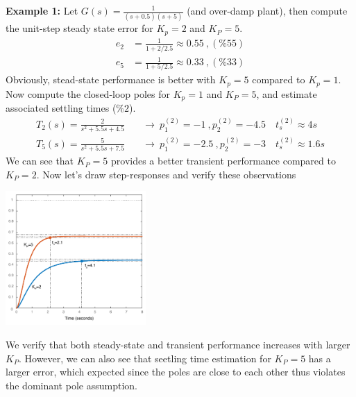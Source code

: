 \documentclass[twoside]{article}
\begin{document}
\textbf{Example 1:} Let $G(s) = \frac{1}{(s+0.5)(s+5)}$ (and over-damp
plant), then compute the unit-step steady state error for $K_p = 2$ and $K_P = 5$.
%
\begin{align*}
  e_{2} &= \frac{1}{1 + 2 / 2.5} \approx 0.55 \ , (\%55) 
\\
  e_{5} &= \frac{1}{1 + 5 / 2.5} \approx 0.33 \ , (\%33) 
\end{align*}
%
Obviously, stead-state performance is better with $K_p = 5$
compared to $K_p = 1$. Now compute the closed-loop poles
for $K_p = 1$ and $K_P = 5$, and estimate associated 
settling times ($\%2$).
%
\begin{align*}
  T_2(s) = \frac{2}{s^2 + 5.5 s + 4.5} &\quad \rightarrow \
  p^{(2)}_{1} = -1 \ ,  p^{(2)}_{2} = -4.5  \quad t^{(2)}_s \approx 4
  s 
\\
  T_5(s) = \frac{5}{s^2 + 5.5 s + 7.5} &\quad \rightarrow \
  p^{(2)}_{1} = -2.5 \ ,  p^{(2)}_{2} = -3  \quad t^{(2)}_s \approx
                                         1.6 s 
\end{align*}
%
We can see that $K_P = 5$ provides a better transient performance
compared to $K_P = 2$. Now let's draw step-responses and
verify these observations

\vspace{12 pt}

  \begin{minipage}[h]{1\linewidth}
    \begin{center}
      \includegraphics[width=0.4\textwidth]{Pcont1}
    \end{center}
  \end{minipage}

\vspace{12 pt}

We verify that both steady-state and transient performance increases
with larger $K_P$. However, we can also see that seetling time
estimation for $K_P = 5$ has a larger error, which expected
since the poles are close to each other thus violates the
dominant pole assumption. 
\end{document}
